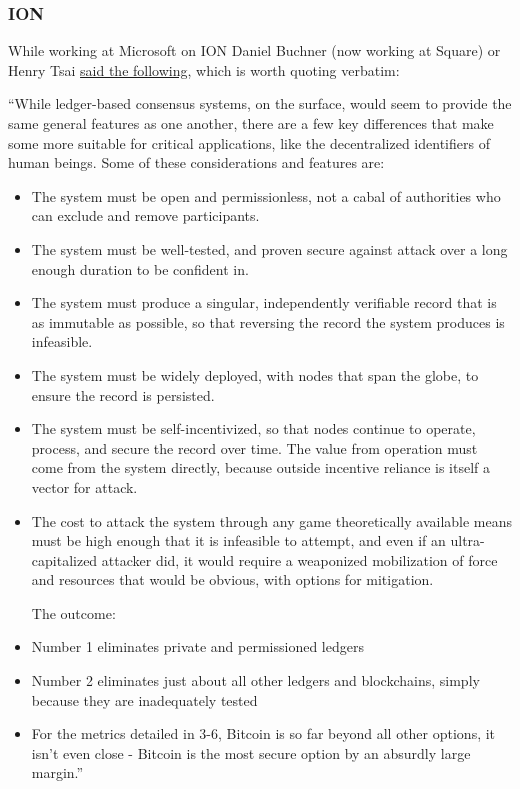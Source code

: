 \subsubsection{ION} 
While working at Microsoft on ION Daniel Buchner (now working at Square) or Henry Tsai \href{https://github.com/decentralized-identity/ion/blob/master/docs/Q-and-A.md}{said the following}, which is worth quoting verbatim:\par
``While ledger-based consensus systems, on the surface, would seem to provide the same general features as one another, there are a few key differences that make some more suitable for critical applications, like the decentralized identifiers of human beings. Some of these considerations and features are:
\begin{itemize}
\item The system must be open and permissionless, not a cabal of authorities who can exclude and remove participants.
\item The system must be well-tested, and proven secure against attack over a long enough duration to be confident in.
\item The system must produce a singular, independently verifiable record that is as immutable as possible, so that reversing the record the system produces is infeasible.
\item The system must be widely deployed, with nodes that span the globe, to ensure the record is persisted.
\item The system must be self-incentivized, so that nodes continue to operate, process, and secure the record over time. The value from operation must come from the system directly, because outside incentive reliance is itself a vector for attack.
\item The cost to attack the system through any game theoretically available means must be high enough that it is infeasible to attempt, and even if an ultra-capitalized attacker did, it would require a weaponized mobilization of force and resources that would be obvious, with options for mitigation.\par

The outcome:

\item Number 1 eliminates private and permissioned ledgers
\item Number 2 eliminates just about all other ledgers and blockchains, simply because they are inadequately tested
\item For the metrics detailed in 3-6, Bitcoin is so far beyond all other options, it isn't even close - Bitcoin is the most secure option by an absurdly large margin.''
\end{itemize}


